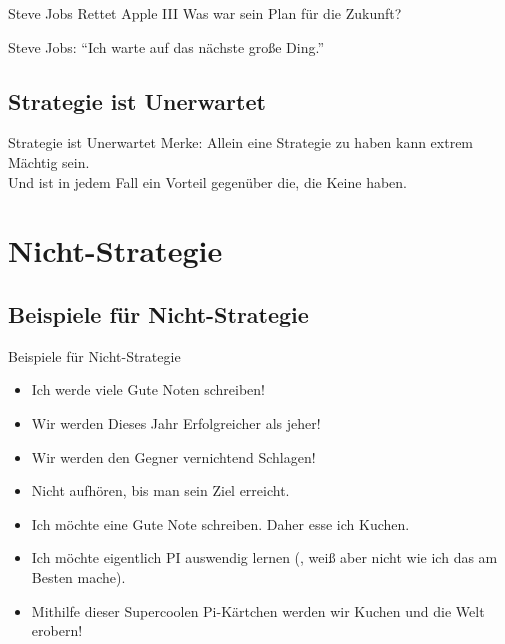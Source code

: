 \begin{frame}[c]{Steve Jobs Rettet Apple III}
    \Large
    Was war sein Plan für die Zukunft? \\
    \pause

    Steve Jobs: ``Ich warte auf das nächste große Ding.''

\end{frame}

\subsection{Strategie ist Unerwartet}

\begin{frame}[c]{Strategie ist Unerwartet}
    \Large
    Merke: Allein eine Strategie zu haben kann extrem Mächtig sein. \\
    \ifonline Und ist in jedem Fall ein Vorteil gegenüber die, die Keine haben.
    \fi
\end{frame}



\section{Nicht-Strategie}

\subsection{Beispiele für Nicht-Strategie}

\ifonline
\begin{frame}[c]{Beispiele für Nicht-Strategie}
    \begin{itemize}
        \item Ich werde viele Gute Noten schreiben! \pause
        \item Wir werden Dieses Jahr Erfolgreicher als jeher! \pause
        \item Wir werden den Gegner vernichtend Schlagen! \pause
        \item Nicht aufhören, bis man sein Ziel erreicht. \pause
        \item Ich möchte eine Gute Note schreiben. Daher esse ich Kuchen. \pause
        \item Ich möchte eigentlich PI auswendig lernen (, weiß aber nicht wie ich das am Besten mache). \pause
        \item Mithilfe dieser Supercoolen Pi-Kärtchen werden wir Kuchen und die Welt erobern!
    \end{itemize}
\end{frame}
\fi

